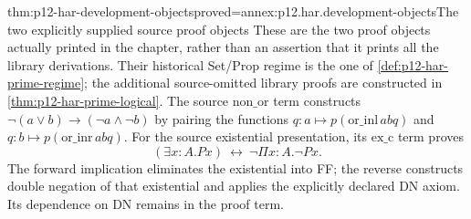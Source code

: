 \begin{hbtheorem}{thm:p12-har-development-objects}{proved=annex:p12.har.development-objects}{The two explicitly supplied source proof objects}
These are the two proof objects actually printed in the chapter, rather
than an assertion that it prints all the library derivations. Their
historical Set/Prop regime is the one of
\cref{def:p12-har-prime-regime}; the additional source-omitted library
proofs are constructed in \cref{thm:p12-har-prime-logical}.
The source \(\mathrm{non\_or}\) term constructs
\(\neg(a\lor b)\to(\neg a\land\neg b)\)
by pairing the functions \(q:a\mapsto p(\mathrm{or\_inl}\,a b q)\)
and \(q:b\mapsto p(\mathrm{or\_inr}\,a b q)\).
For the source existential presentation, its \(\mathrm{ex\_c}\)
term proves
\[
 (\exists x:A.Px)\ \longleftrightarrow\
       \neg\Pi x:A.\neg Px.
\]
The forward implication eliminates the existential into FF; the reverse
constructs double negation of that existential and applies the explicitly
declared DN axiom. Its dependence on DN remains in the proof term.
\end{hbtheorem}

